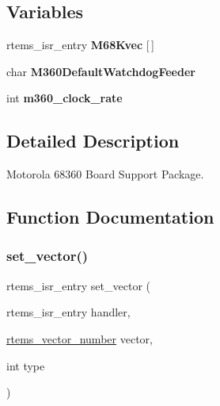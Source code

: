 \subsection*{Variables}
\begin{DoxyCompactItemize}
\item 
\mbox{\label{group__RTEMSBSPsM68kGen68360_ga744e8a50e2dcbb8fb7e6b0c7554008f9}} 
rtems\+\_\+isr\+\_\+entry {\bfseries M68\+Kvec} \mbox{[}$\,$\mbox{]}
\item 
\mbox{\label{group__RTEMSBSPsM68kGen68360_ga2f9ba59445429ff8eab74ba0cc3f54fe}} 
char {\bfseries M360\+Default\+Watchdog\+Feeder}
\item 
\mbox{\label{group__RTEMSBSPsM68kGen68360_ga292bb5999aff7f06502a3a5d778931bd}} 
int {\bfseries m360\+\_\+clock\+\_\+rate}
\end{DoxyCompactItemize}


\subsection{Detailed Description}
Motorola 68360 Board Support Package. 



\subsection{Function Documentation}
\mbox{\label{group__RTEMSBSPsM68kGen68360_gab3388042c56b34c40be81fd5f028d97e}} 
\subsubsection{\texorpdfstring{set\_vector()}{set\_vector()}}
{\footnotesize\ttfamily rtems\+\_\+isr\+\_\+entry set\+\_\+vector (\begin{DoxyParamCaption}\item[{rtems\+\_\+isr\+\_\+entry}]{handler,  }\item[{\mbox{\hyperlink{group__ClassicINTR_ga3e434c197d99f128e78cae4d9358bd8b}{rtems\+\_\+vector\+\_\+number}}}]{vector,  }\item[{int}]{type }\end{DoxyParamCaption})}



